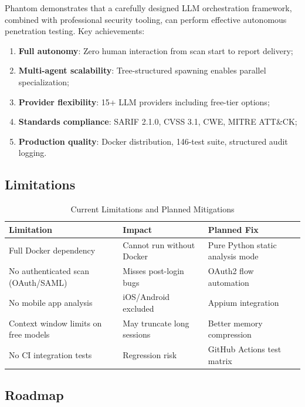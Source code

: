 \documentclass[12pt,a4paper]{article}
\begin{document}
Phantom demonstrates that a carefully designed LLM orchestration framework, combined with professional security tooling, can perform effective autonomous penetration testing. Key achievements:

\begin{enumerate}
  \item \textbf{Full autonomy}: Zero human interaction from scan start to report delivery;
  \item \textbf{Multi-agent scalability}: Tree-structured spawning enables parallel specialization;
  \item \textbf{Provider flexibility}: 15+ LLM providers including free-tier options;
  \item \textbf{Standards compliance}: SARIF 2.1.0, CVSS 3.1, CWE, MITRE ATT\&CK;
  \item \textbf{Production quality}: Docker distribution, 146-test suite, structured audit logging.
\end{enumerate}

\subsection{Limitations}

\begin{table}[H]
\centering
\caption{Current Limitations and Planned Mitigations}
\begin{tabular}{p{4cm}p{4.5cm}p{4.5cm}}
\toprule
\textbf{Limitation} & \textbf{Impact} & \textbf{Planned Fix} \\
\midrule
Full Docker dependency & Cannot run without Docker & Pure Python static analysis mode \\
No authenticated scan (OAuth/SAML) & Misses post-login bugs & OAuth2 flow automation \\
No mobile app analysis & iOS/Android excluded & Appium integration \\
Context window limits on free models & May truncate long sessions & Better memory compression \\
No CI integration tests & Regression risk & GitHub Actions test matrix \\
\bottomrule
\end{tabular}
\end{table}

\subsection{Roadmap}
\end{document}
